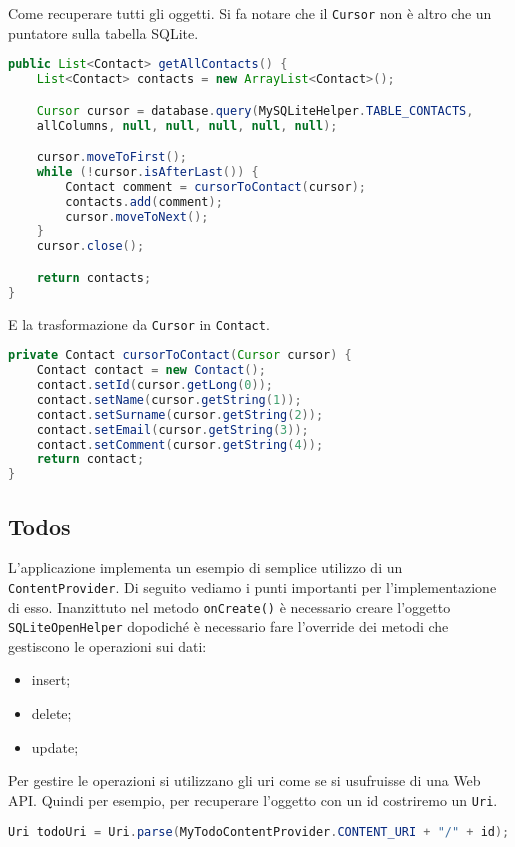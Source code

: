 Come recuperare tutti gli oggetti. Si fa notare che il \lstinline|Cursor| non è altro che un puntatore sulla tabella SQLite.
\begin{lstlisting}[language=Java]
public List<Contact> getAllContacts() {
	List<Contact> contacts = new ArrayList<Contact>();

	Cursor cursor = database.query(MySQLiteHelper.TABLE_CONTACTS,
	allColumns, null, null, null, null, null);

	cursor.moveToFirst();
	while (!cursor.isAfterLast()) {
		Contact comment = cursorToContact(cursor);
		contacts.add(comment);
		cursor.moveToNext();
	}
	cursor.close();

	return contacts;
}
\end{lstlisting}

E la trasformazione da \texttt{Cursor} in \texttt{Contact}.
\begin{lstlisting}[language=Java]
private Contact cursorToContact(Cursor cursor) {
	Contact contact = new Contact();
	contact.setId(cursor.getLong(0));
	contact.setName(cursor.getString(1));
	contact.setSurname(cursor.getString(2));
	contact.setEmail(cursor.getString(3));
	contact.setComment(cursor.getString(4));
	return contact;
}
\end{lstlisting}


\subsection{Todos}
L'applicazione implementa un esempio di semplice utilizzo di un \lstinline|ContentProvider|. Di seguito vediamo i punti importanti per l'implementazione di esso. Inanzittuto nel metodo \lstinline|onCreate()| è necessario creare l'oggetto \lstinline|SQLiteOpenHelper| dopodiché è necessario fare l'override dei metodi che gestiscono le operazioni sui dati:
\begin{itemize}
	\item insert;
	\item delete;
	\item update;
\end{itemize}

Per gestire le operazioni si utilizzano gli uri come se si usufruisse di una Web API. Quindi per esempio, per recuperare l'oggetto con un id costriremo un \lstinline|Uri|.
\begin{lstlisting}[language=Java]
Uri todoUri = Uri.parse(MyTodoContentProvider.CONTENT_URI + "/" + id);
\end{lstlisting}

